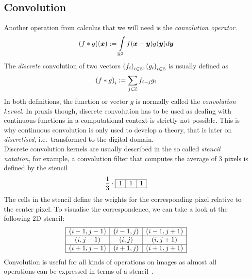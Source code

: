 \subsection{Convolution}
Another operation from calculus that we will need is the \textit{convolution operator}.\\
\begin{equation}
    (f * g)(\boldsymbol x) := \int\limits_{\mathbb{R}^2} f(\boldsymbol x-\boldsymbol y)g(\boldsymbol y)d\boldsymbol y\label{eq:2DConv}
\end{equation}
The \textit{discrete} convolution of two vectors ${(f_i)}_{i\in\mathbb{Z}}, {(g_i)}_{i\in\mathbb{Z}}$ is usually defined as
\begin{equation}
    {(f*g)}_i := \sum_{j\in\mathbb{Z}} f_{i-j}g_i
\end{equation}
In both definitions, the function or vector $g$ is normally called the \textit{convolution kernel}.
In praxis though, discrete convolution has to be used as dealing with continuous functions in a
computational context is strictly not possible. This is why continuous convolution is only used to
develop a theory, that is later on \textit{discretised}, i.e.\ transformed to the digital
domain.\\
Discrete convolution kernels are usually described in the so called \textit{stencil notation}, for
example, a convolution filter that computes the average of 3 pixels is defined by the stencil
\begin{equation}
    \frac{1}{3} \cdot \begin{array}{|c|c|c|}
       \hline
       1 & 1 & 1\\
       \hline
    \end{array}
\end{equation}
The cells in the stencil define the weights for the corresponding pixel relative to the center
pixel. To visualise the correspondence, we can take a look at the following 2D stencil:
\begin{equation}
    \begin{array}{|c|c|c|}
       \hline
       (i-1,j-1) & (i-1, j) & (i-1, j+1)\\\hline
       (i,j-1) & (i, j) & (i, j+1)\\\hline
       (i+1,j-1) & (i+1, j) & (i+1, j+1)\\\hline
    \end{array}
\end{equation}
Convolution is useful for all kinds of operations on images as almost all operations can be
expressed in terms of a stencil~\cite{ipcv}.
